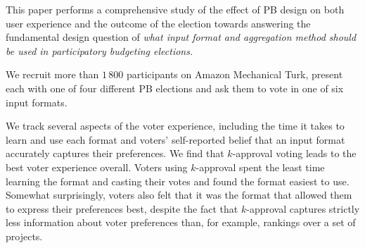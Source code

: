 \documentclass{comsoc2023}
\begin{document}
This paper performs   a comprehensive  study of the effect of PB design on both user experience and the outcome of the election   towards answering the fundamental design question of
\emph{what input format and aggregation method should be used  in participatory budgeting elections.
}







We recruit more than $1\,800$ participants on Amazon Mechanical Turk,  present each with one of four different PB elections  and ask them to vote in one of six   input formats. 

We track several aspects of the voter experience, including the time it takes to learn and use each format and voters' self-reported belief that an input format accurately captures their preferences.  
%
We find that $k$-approval voting leads to the best voter experience overall. Voters using $k$-approval spent the least time  learning the format and casting their votes and found the format easiest to use. Somewhat surprisingly, voters also felt that  it was the format that allowed them to express their preferences best, despite the fact that $k$-approval captures strictly less information about voter preferences than, for example,  rankings over a set of projects. 
\end{document}
